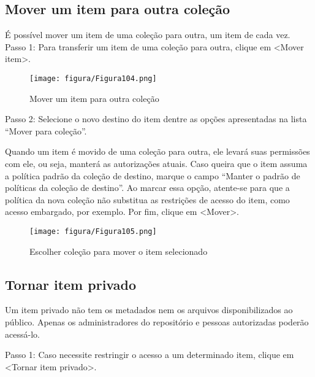 \documentclass[12pt,hidelinks]{article}
\begin{document}
\newpage

    \subsection{Mover um item para outra coleção}
    
    É possível mover um item de uma coleção para outra, um item de cada vez. \\
    
    Passo 1: Para transferir um item de uma coleção para outra, clique em <Mover item>.
    
    \begin{figure}[!htp]
                \centering
                \texttt{[image: figura/Figura104.png]}
                \caption{Mover um item para outra coleção}
            \label{Rotulo}
        \end{figure}
    
    Passo 2: Selecione o novo destino do item dentre as opções apresentadas na lista “Mover para coleção”.
    
    \singlespacing
    
    Quando um item é movido de uma coleção para outra, ele levará suas permissões com ele, ou seja, manterá as autorizações atuais. Caso queira que o item assuma a política padrão da coleção de destino, marque o campo “Manter o padrão de políticas da coleção de destino”. Ao marcar essa opção, atente-se para que a política da nova coleção não substitua as restrições de acesso do item, como acesso embargado, por exemplo. Por fim, clique em <Mover>.
    
     \begin{figure}[!htp]
                \centering
                \texttt{[image: figura/Figura105.png]}
                \caption{Escolher coleção para mover o item selecionado}
            \label{Rotulo}
        \end{figure}

\newpage

    \subsection{Tornar item privado}
    
    Um item privado não tem os metadados nem os arquivos disponibilizados ao público. Apenas os administradores do repositório e pessoas autorizadas poderão acessá-lo.
    
    \singlespacing
    
    Passo 1: Caso necessite restringir o acesso a um determinado item, clique em <Tornar item privado>.
    
\end{document}
